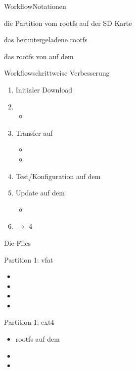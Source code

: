 \begin{frame}{Workflow}{Notationen}
 \begin{description}
  \item[\cod{\em sd-card}] die Partition vom rootfs auf der SD Karte
  \item[\cod{target-root-{\em V}.tar.gz}] das heruntergeladene rootfs
  \item[\cod{\em target-root}] das rootfs von \targetS auf dem \host
 \end{description}
\end{frame}

\begin{frame}{Workflow}{schrittweise Verbesserung}
 \begin{enumerate}
  \item Initialer Download 
  \item {}
  \begin{itemize}
   \item {}
  \end{itemize} 
  \item Transfer auf 
  \begin{itemize}
   \item {}
   \item {} 
  \end{itemize} 
  \item Test/Konfiguration auf dem \targetS
  \item Update auf dem \host
  \begin{itemize}
   \item {}
  \end{itemize} 
  \item $\to$ 4
 \end{enumerate}
\end{frame}

\begin{frame}{Die Files}
 \begin{block}{Partition 1: vfat}
  \begin{itemize}
   \item {}
   \item {}
   \item {}
   \item {}
  \end{itemize}
 \end{block}
 \begin{block}{Partition 1: ext4}
  \begin{itemize}
   \item rootfs auf dem \host
   \item {}
   \item {}
  \end{itemize}
 \end{block}
 
\end{frame}

